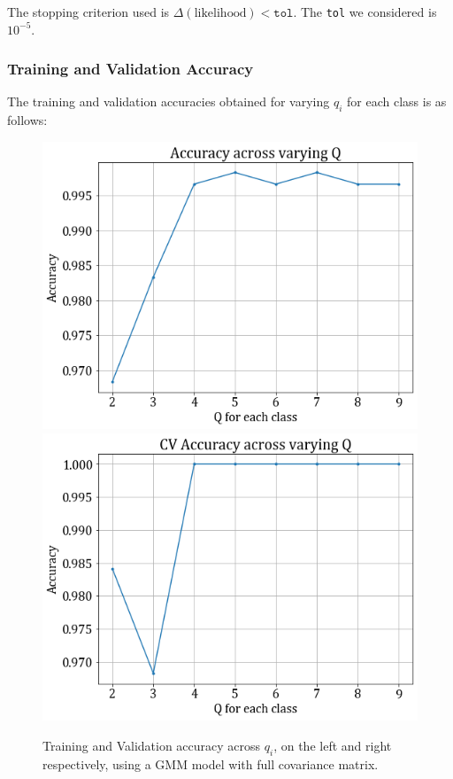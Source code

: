 \documentclass[11pt,a4paper]{article}
\newcommand{\noi}{\noindent}
\def\tt#1{\texttt{#1}}
\begin{document}
\noi
The stopping criterion used is $\Delta(\text{likelihood})<\tt{tol}$. The \tt{tol} we considered is $10^{-5}$.\\

\subsubsection{Training and Validation Accuracy}
The training and validation accuracies obtained for varying $q_i$ for each class is as follows:
\begin{figure}[H]
    \centering
    \hspace{-2em}
    \includegraphics[scale=0.45]{images/1b_full_train.png}
    \includegraphics[scale=0.45]{images/1b_full_val.png}
    \caption{Training and Validation accuracy across $q_i$, on the left and right respectively, using a GMM model with full covariance matrix.}
\end{figure}
\end{document}
